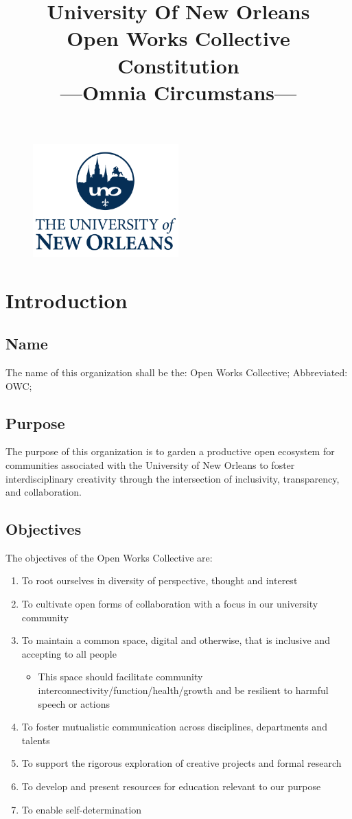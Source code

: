 \documentclass{article}
\title{University Of New Orleans \\ Open Works Collective Constitution \\ ---Omnia Circumstans---}
\newcommand{\article}[1]{\section{#1} \label{#1}}
\newcommand{\asection}[1]{\subsection{#1} \label{#1}}
\begin{document}



\maketitle

\begin{figure}[h!]
\centering
\includegraphics[width=0.5\textwidth]{UNO.png}
\end{figure}
\thispagestyle{empty}

\newpage

\tableofcontents

\newpage
\article{Introduction}

\asection{Name}
The name of this organization shall be the: Open Works Collective;
Abbreviated: OWC; 

\asection{Purpose}
The purpose of this organization is to garden a productive open ecosystem for communities associated with the University of New Orleans to foster interdisciplinary creativity through the intersection of inclusivity, transparency, and collaboration.

\asection{Objectives}
The objectives of the Open Works Collective are:
\begin{enumerate}
    \item To root ourselves in diversity of perspective, thought and interest
	\item To cultivate open forms of collaboration with a focus in our university community
	\item To maintain a common space, digital and otherwise, that is inclusive and accepting to all people
	\begin{itemize}
	    \item This space should facilitate community interconnectivity/function/health/growth and be resilient to harmful speech or actions
	\end{itemize}
	\item To foster mutualistic communication across disciplines, departments and talents
	\item To support the rigorous exploration of creative projects and formal research
	\item To develop and present resources for education relevant to our purpose 
	\item To enable self-determination
\end{enumerate}
\end{document}
